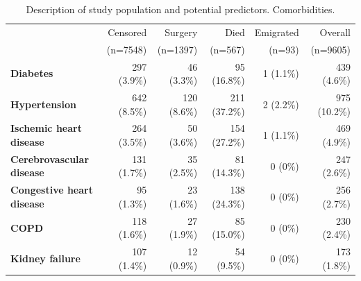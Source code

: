 \documentclass{statsoc}
\begin{document}
\begin{table}
\caption{Description of study population and potential predictors. Comorbidities. \label{tab1c}} 
\centering
\begin{tabular}{lrrrrr}
\hline
& Censored & Surgery & Died & Emigrated &  Overall \\
& (n=7548) & (n=1397) & (n=567) & (n=93) & (n=9605) \\
\hline
\textbf{Diabetes} & 297 (3.9\%) & 46 (3.3\%) & 95 (16.8\%) & 1 (1.1\%) & 439 (4.6\%) \\
\textbf{Hypertension} & 642 (8.5\%) & 120 (8.6\%) & 211 (37.2\%) & 2 (2.2\%) & 975 (10.2\%) \\
\textbf{Ischemic heart disease} & 264 (3.5\%) & 50 (3.6\%) & 154 (27.2\%) & 1 (1.1\%) & 469 (4.9\%) \\
\textbf{Cerebrovascular disease} & 131 (1.7\%) & 35 (2.5\%) & 81 (14.3\%) & 0 (0\%) & 247 (2.6\%) \\
\textbf{Congestive heart disease} & 95 (1.3\%) & 23 (1.6\%) & 138 (24.3\%) & 0 (0\%) & 256 (2.7\%) \\
\textbf{COPD}  & 118 (1.6\%) & 27 (1.9\%) & 85 (15.0\%) & 0 (0\%) & 230 (2.4\%) \\
\textbf{Kidney failure} & 107 (1.4\%) & 12 (0.9\%) & 54 (9.5\%) & 0 (0\%) & 173 (1.8\%) \\
\hline
\end{tabular}
\end{table}




%
%
\end{document}
